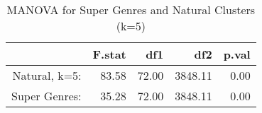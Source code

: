 \begin{table}[ht]
\centering
\caption{MANOVA for Super Genres and Natural Clusters (k=5)}
\begin{tabular}{rrrrr}
  \hline
 & F.stat & df1 & df2 & p.val \\ 
  \hline
Natural, k=5: & 83.58 & 72.00 & 3848.11 & 0.00 \\ 
  Super Genres: & 35.28 & 72.00 & 3848.11 & 0.00 \\ 
   \hline
\end{tabular}
\end{table}
